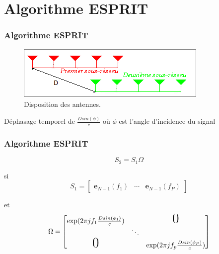 \documentclass[10pt]{beamer}
\begin{document}
    
    \section{Algorithme ESPRIT}    
    \begin{frame}
        \frametitle{Algorithme ESPRIT}
        
        \begin{figure}[h]
            \centering
            \includegraphics[scale=.6]{images/ReseauEsprit}
            \caption{Disposition des antennes.}
        \end{figure}
        
        Déphasage temporel de \( \frac{D sin(\phi) }{c}  \) où
        \(\phi\) est l'angle d'incidence du signal

        
    \end{frame}
    
    
    \begin{frame}
        \frametitle{Algorithme ESPRIT}
        
        \begin{equation}
          S_2 = S_1 \Omega
        \end{equation}
        
        si \[ S_1 = \begin{bmatrix}
        \boldsymbol{e}_{N-1}(f_1) & \cdots & \boldsymbol{e}_{N-1}(f_P)
    \end{bmatrix} \]
    
    et \[ \Omega = \begin{bmatrix}
         \exp(2\pi j f_1 \frac{D sin(\phi_1) }{c}) & & \text{\huge0}\\
         &  \ddots \\
         \text{\huge0} & & \exp(2\pi j f_p \frac{D sin(\phi_P) }{c})\\

         \end{bmatrix} \]

    \end{frame}
    
\end{document}

